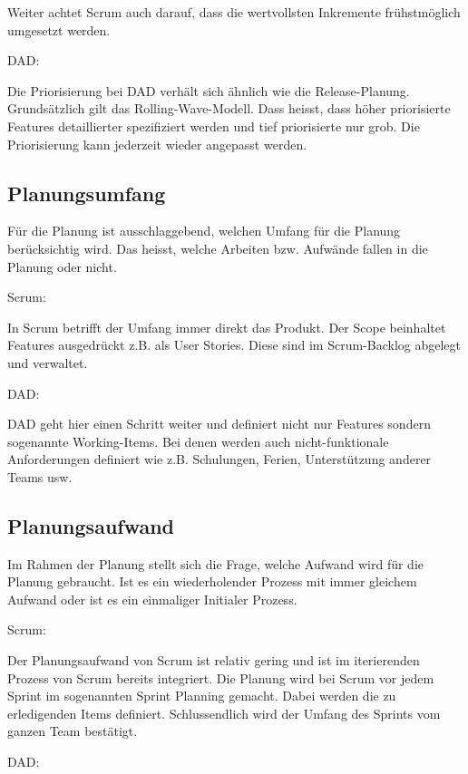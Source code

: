 Weiter achtet Scrum auch darauf, dass die wertvollsten Inkremente frühstmöglich umgesetzt werden.\bigskip 

{\Large DAD:} \cite{planningPrioDad} \medskip

Die Priorisierung bei DAD verhält sich ähnlich wie die Release-Planung. Grundsätzlich gilt das Rolling-Wave-Modell. Dass heisst, dass höher priorisierte Features detaillierter spezifiziert werden und tief priorisierte nur grob. Die Priorisierung kann jederzeit wieder angepasst werden.


\subsection{Planungsumfang}

Für die Planung ist ausschlaggebend, welchen Umfang für die Planung berücksichtig wird. Das heisst, welche Arbeiten bzw. Aufwände fallen in die Planung oder nicht.

{\Large Scrum:} \medskip

In Scrum betrifft der Umfang immer direkt das Produkt. Der Scope beinhaltet Features ausgedrückt z.B. als User Stories. Diese sind im Scrum-Backlog abgelegt und verwaltet.
\bigskip 

{\Large DAD:} \cite{planningScopeDad} \medskip

DAD geht hier einen Schritt weiter und definiert nicht nur Features sondern sogenannte Working-Items. Bei denen werden auch nicht-funktionale Anforderungen definiert wie z.B. Schulungen, Ferien, Unterstützung anderer Teams usw.	


\subsection{Planungsaufwand}

Im Rahmen der Planung stellt sich die Frage, welche Aufwand wird für die Planung gebraucht. Ist es ein wiederholender Prozess mit immer gleichem Aufwand oder ist es ein einmaliger Initialer Prozess.

{\Large Scrum:} \medskip

Der Planungsaufwand von Scrum ist relativ gering und ist im iterierenden Prozess von Scrum bereits integriert. Die Planung wird bei Scrum vor jedem Sprint im sogenannten Sprint Planning gemacht. Dabei werden die zu erledigenden Items definiert. Schlussendlich wird der Umfang des Sprints vom ganzen Team bestätigt.\bigskip 

{\Large DAD:} \medskip

